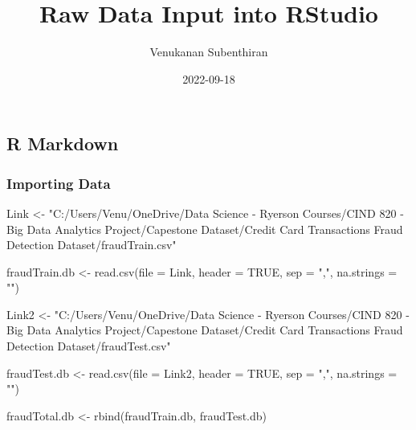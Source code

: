 \documentclass[
]{article}
\title{Raw Data Input into RStudio}
\author{Venukanan Subenthiran}
\date{2022-09-18}
\newenvironment{Shaded}{\begin{snugshade}}{\end{snugshade}}
\newcommand{\AttributeTok}[1]{\textcolor[rgb]{0.77,0.63,0.00}{#1}}
\newcommand{\ConstantTok}[1]{\textcolor[rgb]{0.00,0.00,0.00}{#1}}
\newcommand{\FunctionTok}[1]{\textcolor[rgb]{0.00,0.00,0.00}{#1}}
\newcommand{\NormalTok}[1]{#1}
\newcommand{\OtherTok}[1]{\textcolor[rgb]{0.56,0.35,0.01}{#1}}
\newcommand{\StringTok}[1]{\textcolor[rgb]{0.31,0.60,0.02}{#1}}
\begin{document}
\maketitle

\hypertarget{r-markdown}{%
\subsection{R Markdown}\label{r-markdown}}

\hypertarget{importing-data}{%
\subsubsection{Importing Data}\label{importing-data}}

\begin{Shaded}
\begin{Highlighting}[]
\NormalTok{ Link }\OtherTok{\textless{}{-}} \StringTok{"C:/Users/Venu/OneDrive/Data Science {-} Ryerson Courses/CIND 820 {-} Big Data Analytics Project/Capestone Dataset/Credit Card Transactions Fraud Detection Dataset/fraudTrain.csv"}

\NormalTok{fraudTrain.db }\OtherTok{\textless{}{-}} \FunctionTok{read.csv}\NormalTok{(}\AttributeTok{file =}\NormalTok{ Link, }\AttributeTok{header =} \ConstantTok{TRUE}\NormalTok{, }\AttributeTok{sep =} \StringTok{","}\NormalTok{, }\AttributeTok{na.strings =} \StringTok{""}\NormalTok{)}
\end{Highlighting}
\end{Shaded}

\begin{Shaded}
\begin{Highlighting}[]
\NormalTok{ Link2 }\OtherTok{\textless{}{-}} \StringTok{"C:/Users/Venu/OneDrive/Data Science {-} Ryerson Courses/CIND 820 {-} Big Data Analytics Project/Capestone Dataset/Credit Card Transactions Fraud Detection Dataset/fraudTest.csv"}

\NormalTok{fraudTest.db }\OtherTok{\textless{}{-}} \FunctionTok{read.csv}\NormalTok{(}\AttributeTok{file =}\NormalTok{ Link2, }\AttributeTok{header =} \ConstantTok{TRUE}\NormalTok{, }\AttributeTok{sep =} \StringTok{","}\NormalTok{, }\AttributeTok{na.strings =} \StringTok{""}\NormalTok{)}
\end{Highlighting}
\end{Shaded}

\begin{Shaded}
\begin{Highlighting}[]
\NormalTok{fraudTotal.db }\OtherTok{\textless{}{-}} \FunctionTok{rbind}\NormalTok{(fraudTrain.db, fraudTest.db)}
\end{Highlighting}
\end{Shaded}
\end{document}
